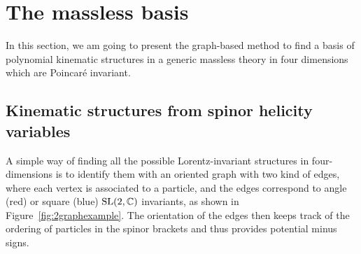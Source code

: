 \documentclass[aps,prd,nofootinbib,twocolumn,10pt]{revtex4-2}
\begin{document}
\section{The massless basis}

In this section, we am going to present the graph-based method to find a basis of polynomial kinematic structures in a generic massless theory in four dimensions which are Poincaré invariant.

\subsection{Kinematic structures from spinor helicity variables}
\label{sec:kinematics}

A simple way of finding all the possible Lorentz-invariant structures in four-dimensions is to identify them with an oriented graph with two kind of edges, where each vertex is associated to a particle, and the edges correspond to angle (red) or square (blue) ${\rm SL}(2,\mathbb{C})$ invariants, as shown in Figure~\ref{fig:2graphexample}. The orientation of the edges then keeps track of the ordering of particles in the spinor brackets and thus provides potential minus signs.
\end{document}
